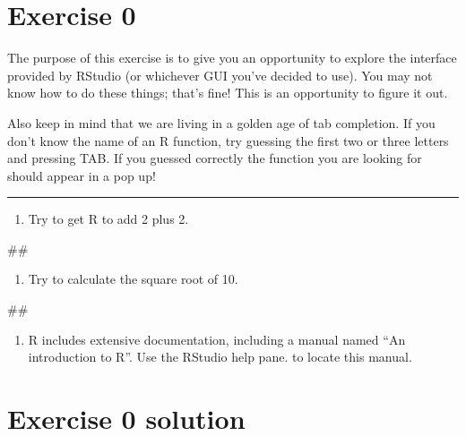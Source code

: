 \documentclass[]{book}
\newenvironment{Shaded}{\begin{snugshade}}{\end{snugshade}}
\newcommand{\NormalTok}[1]{#1}
\providecommand{\tightlist}{%
  \setlength{\itemsep}{0pt}\setlength{\parskip}{0pt}}
\begin{document}
\section{Exercise 0}\label{exercise-0}

The purpose of this exercise is to give you an opportunity to explore
the interface provided by RStudio (or whichever GUI you've decided to
use). You may not know how to do these things; that's fine! This is an
opportunity to figure it out.

Also keep in mind that we are living in a golden age of tab completion.
If you don't know the name of an R function, try guessing the first two
or three letters and pressing TAB. If you guessed correctly the function
you are looking for should appear in a pop up!

\begin{center}\rule{0.5\linewidth}{\linethickness}\end{center}

\begin{enumerate}
\def\labelenumi{\arabic{enumi}.}
\tightlist
\item
  Try to get R to add 2 plus 2.
\end{enumerate}

\begin{Shaded}
\begin{Highlighting}[]
\NormalTok{##}
\end{Highlighting}
\end{Shaded}

\begin{enumerate}
\def\labelenumi{\arabic{enumi}.}
\setcounter{enumi}{1}
\tightlist
\item
  Try to calculate the square root of 10.
\end{enumerate}

\begin{Shaded}
\begin{Highlighting}[]
\NormalTok{##}
\end{Highlighting}
\end{Shaded}

\begin{enumerate}
\def\labelenumi{\arabic{enumi}.}
\setcounter{enumi}{2}
\tightlist
\item
  R includes extensive documentation, including a manual named ``An
  introduction to R''. Use the RStudio help pane. to locate this manual.
\end{enumerate}

\section{Exercise 0 solution}\label{exercise-0-solution}
\end{document}
